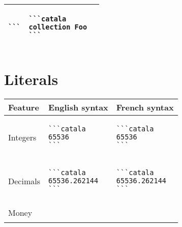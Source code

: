 \documentclass[a3paper,landscape]{article}
\begin{document}
\begin{multicols*}{2}
\begin{center}
\begin{tabular}{p{}p{}p{}}
\begin{verbatim}
```
\end{verbatim}
      \vspace*{-1.75em}
                       &
      \vspace*{-1.75em}
      \begin{verbatim}
```catala
collection Foo
```
\end{verbatim}
      \vspace*{-1.75em}
      \\
      \bottomrule
    \end{tabular}
  \end{center}





  \section*{Literals}
  \begin{center}
    \begin{tabular}{p{}p{}p{}}
      \toprule
      Feature   & English syntax & French syntax \\\midrule
      Integers  &
      \vspace*{-1.75em}
      \begin{verbatim}
```catala
65536
```
\end{verbatim}
      \vspace*{-1.75em}
                &
      \vspace*{-1.75em}
      \begin{verbatim}
```catala
65536
```
\end{verbatim}
      \vspace*{-1.75em}
      \\
      Decimals  &
      \vspace*{-1.75em}
      \begin{verbatim}
```catala
65536.262144
```
\end{verbatim}
      \vspace*{-1.75em}
                &
      \vspace*{-1.75em}
      \begin{verbatim}
```catala
65536.262144
```
\end{verbatim}
      \vspace*{-1.75em}
      \\
      Money     &
      \vspace*{-1.75em}
      \begin{verbatim}

\end{verbatim}
\end{tabular}
\end{center}
\end{multicols*}
\end{document}
